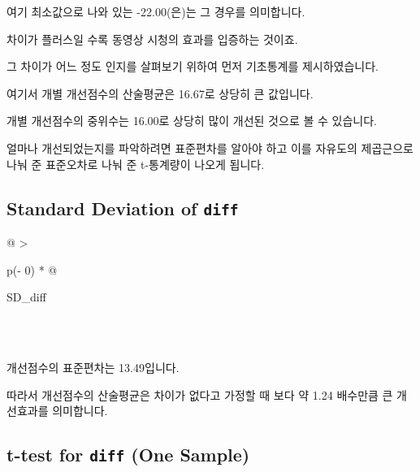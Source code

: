 \documentclass[
]{book}
\begin{document}
여기 최소값으로 나와 있는 -22.00(은)는 그 경우를 의미합니다.

차이가 플러스일 수록 동영상 시청의 효과를 입증하는 것이죠.

그 차이가 어느 정도 인지를 살펴보기 위하여 먼저 기초통계를 제시하였습니다.

여기서 개별 개선점수의 산술평균은 16.67로 상당히 큰 값입니다.

개별 개선점수의 중위수는 16.00로 상당히 많이 개선된 것으로 볼 수 있습니다.

얼마나 개선되었는지를 파악하려면 표준편차를 알아야 하고 이를 자유도의 제곱근으로 나눠 준 표준오차로 나눠 준 t-통계량이 나오게 됩니다.

\subsection{\texorpdfstring{Standard Deviation of \texttt{diff}}{Standard Deviation of diff}}\label{standard-deviation-of-diff}

\begin{longtable}[]{@{}
  >{\raggedright\arraybackslash}p{(\columnwidth - 0\tabcolsep) * }@{}}
\toprule\noalign{}
\begin{minipage}[b]{\linewidth}\raggedright
SD\_diff
\end{minipage} \\
\midrule\noalign{}
\endhead
\bottomrule\noalign{}
 \\
\end{longtable}

개선점수의 표준편차는 13.49입니다.

따라서 개선점수의 산술평균은 차이가 없다고 가정할 때 보다 약 1.24 배수만큼 큰 개선효과를 의미합니다.

\subsection{\texorpdfstring{t-test for \texttt{diff} (One Sample)}{t-test for diff (One Sample)}}\label{t-test-for-diff-one-sample}
\end{document}
